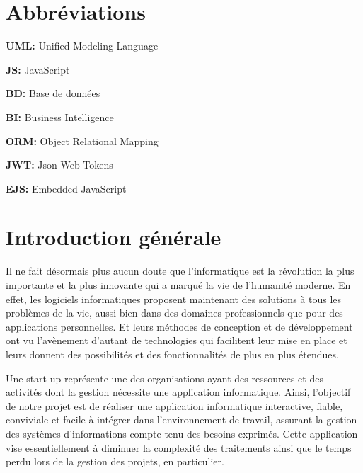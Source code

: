 

\chapter*{Abbr\'{e}viations}
\bigskip

\textbf{UML: } 
Unified Modeling Language
\newline

\textbf{JS: } 
JavaScript
\newline

\textbf{BD: } 
Base de données
\newline

\textbf{ BI:} 
Business Intelligence
\newline

\textbf{ORM: } 
Object Relational Mapping
\newline

\textbf{JWT: } 
Json Web Tokens
\newline

\textbf{EJS: } 
Embedded JavaScript
\newline




\chapter*{Introduction g\'{e}n\'{e}rale}


Il ne fait d\'{e}sormais plus aucun doute que l'informatique est la r\'{e}volution la
plus importante et la plus innovante qui a marqu\'{e} la vie de l'humanit\'{e}
moderne. En effet, les logiciels informatiques proposent maintenant des
solutions \`{a} tous les probl\`{e}mes de la vie, aussi bien dans des domaines
professionnels que pour des applications personnelles. Et leurs m\'{e}thodes de
conception et de d\'{e}veloppement ont vu l'av\`{e}nement d'autant de technologies
qui facilitent leur mise en place et leurs donnent des possibilit\'{e}s et des
fonctionnalit\'{e}s de plus en plus \'{e}tendues.


\bigskip
Une start-up repr\'{e}sente une des organisations ayant des ressources et des
activit\'{e}s dont la gestion n\'{e}cessite une application informatique. Ainsi,
l'objectif de notre projet est de r\'{e}aliser une application informatique
interactive, fiable, conviviale et facile \`{a} int\'{e}grer dans l'environnement de
travail, assurant la gestion des syst\`{e}mes d'informations compte tenu des
besoins exprim\'{e}s. Cette application vise essentiellement \`{a} diminuer la
complexit\'{e} des traitements ainsi que le temps perdu lors de la gestion des
projets, en particulier.

